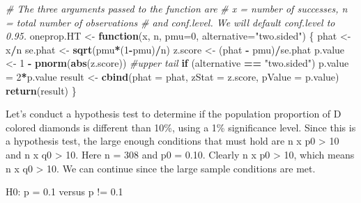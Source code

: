 \documentclass[
]{article}
\newenvironment{Shaded}{\begin{snugshade}}{\end{snugshade}}
\newcommand{\CommentTok}[1]{\textcolor[rgb]{0.56,0.35,0.01}{\textit{#1}}}
\newcommand{\ControlFlowTok}[1]{\textcolor[rgb]{0.13,0.29,0.53}{\textbf{#1}}}
\newcommand{\DataTypeTok}[1]{\textcolor[rgb]{0.13,0.29,0.53}{#1}}
\newcommand{\DecValTok}[1]{\textcolor[rgb]{0.00,0.00,0.81}{#1}}
\newcommand{\KeywordTok}[1]{\textcolor[rgb]{0.13,0.29,0.53}{\textbf{#1}}}
\newcommand{\NormalTok}[1]{#1}
\newcommand{\OperatorTok}[1]{\textcolor[rgb]{0.81,0.36,0.00}{\textbf{#1}}}
\newcommand{\StringTok}[1]{\textcolor[rgb]{0.31,0.60,0.02}{#1}}
\begin{document}
\begin{Shaded}
\begin{Highlighting}[]
\CommentTok{# The three arguments passed to the function are}
\CommentTok{# x = number of successes, n = total number of observations}
\CommentTok{# and conf.level. We will default conf.level to 0.95.}
\NormalTok{oneprop.HT <-}\StringTok{ }\ControlFlowTok{function}\NormalTok{(x, n, }\DataTypeTok{pmu=}\DecValTok{0}\NormalTok{, }\DataTypeTok{alternative=}\StringTok{"two.sided"}\NormalTok{) \{}
\NormalTok{  phat <-}\StringTok{ }\NormalTok{x}\OperatorTok{/}\NormalTok{n}
\NormalTok{  se.phat <-}\StringTok{ }\KeywordTok{sqrt}\NormalTok{(pmu}\OperatorTok{*}\NormalTok{(}\DecValTok{1}\OperatorTok{-}\NormalTok{pmu)}\OperatorTok{/}\NormalTok{n) }
\NormalTok{  z.score <-}\StringTok{ }\NormalTok{(phat }\OperatorTok{-}\StringTok{ }\NormalTok{pmu)}\OperatorTok{/}\NormalTok{se.phat}
\NormalTok{  p.value <-}\StringTok{ }\DecValTok{1} \OperatorTok{-}\StringTok{ }\KeywordTok{pnorm}\NormalTok{(}\KeywordTok{abs}\NormalTok{(z.score)) }\CommentTok{#upper tail}
  \ControlFlowTok{if}\NormalTok{ (alternative }\OperatorTok{==}\StringTok{ "two.sided"}\NormalTok{) p.value =}\StringTok{ }\DecValTok{2}\OperatorTok{*}\NormalTok{p.value}
\NormalTok{  result <-}\StringTok{ }\KeywordTok{cbind}\NormalTok{(}\DataTypeTok{phat =}\NormalTok{ phat, }\DataTypeTok{zStat =}\NormalTok{ z.score, }\DataTypeTok{pValue =}\NormalTok{ p.value)}
  \KeywordTok{return}\NormalTok{(result)}
\NormalTok{\}}
\end{Highlighting}
\end{Shaded}

Let's conduct a hypothesis test to determine if the population
proportion of D colored diamonds is different than 10\%, using a 1\%
significance level. Since this is a hypothesis test, the large enough
conditions that must hold are n x p0 \textgreater{} 10 and n x q0
\textgreater{} 10. Here n = 308 and p0 = 0.10. Clearly n x p0
\textgreater{} 10, which means n x q0 \textgreater{} 10. We can continue
since the large sample conditions are met.

H0: p = 0.1 versus p != 0.1

\begin{Shaded}
\end{Shaded}
\end{document}
